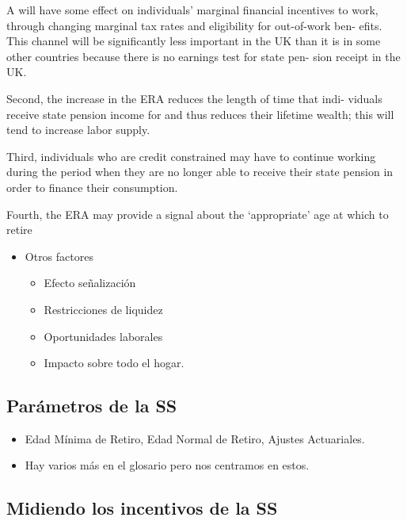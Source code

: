 \documentclass[]{article}
\providecommand{\tightlist}{%
  \setlength{\itemsep}{0pt}\setlength{\parskip}{0pt}}
\begin{document}
A will have some effect on individuals' marginal financial incentives to
work, through changing marginal tax rates and eligibility for
out-of-work ben- efits. This channel will be significantly less
important in the UK than it is in some other countries because there is
no earnings test for state pen- sion receipt in the UK.

Second, the increase in the ERA reduces the length of time that indi-
viduals receive state pension income for and thus reduces their lifetime
wealth; this will tend to increase labor supply.

Third, individuals who are credit constrained may have to continue
working during the period when they are no longer able to receive their
state pension in order to finance their consumption.

Fourth, the ERA may provide a signal about the `appropriate' age at
which to retire

\begin{itemize}
\tightlist
\item
  Otros factores

  \begin{itemize}
  \tightlist
  \item
    Efecto señalización
  \item
    Restricciones de liquidez
  \item
    Oportunidades laborales
  \item
    Impacto sobre todo el hogar.
  \end{itemize}
\end{itemize}

\hypertarget{paruxe1metros-de-la-ss}{%
\subsection{Parámetros de la SS}\label{paruxe1metros-de-la-ss}}

\begin{itemize}
\tightlist
\item
  Edad Mínima de Retiro, Edad Normal de Retiro, Ajustes Actuariales.
\item
  Hay varios más en el glosario pero nos centramos en estos.
\end{itemize}

\hypertarget{midiendo-los-incentivos-de-la-ss}{%
\subsection{Midiendo los incentivos de la
SS}\label{midiendo-los-incentivos-de-la-ss}}
\end{document}
